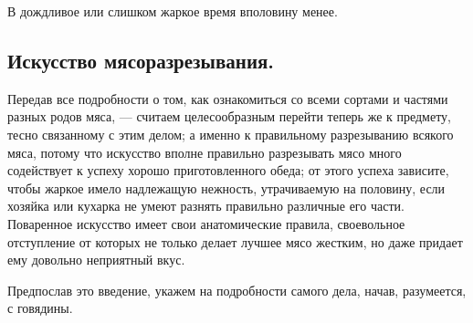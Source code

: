 В дождливое или слишком жаркое время вполовину менее.

\subsection*{Искусство мясоразрезывания.}

Передав все подробности о том, как ознакомиться со всеми сортами и частями разных родов мяса, — считаем целесообразным перейти теперь же к предмету, тесно связанному с этим делом; а именно к правильному разрезыванию всякого мяса, потому что искусство вполне правильно разрезывать мясо много содействует к успеху хорошо приготовленного обеда; от этого успеха зависите, чтобы жаркое имело надлежащую нежность, утрачиваемую на половину, если хозяйка или кухарка не умеют разнять правильно различные его части. Поваренное искусство имеет свои анатомические правила, своевольное отступление от которых не только делает лучшее мясо жестким, но даже придает ему довольно неприятный вкус.

Предпослав это введение, укажем на подробности самого дела, начав, разумеется, с говядины.

